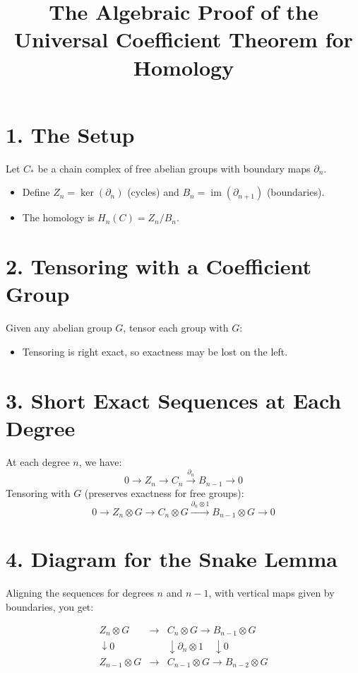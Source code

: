 \documentclass[12pt]{article}
\title{The Algebraic Proof of the Universal Coefficient Theorem for Homology}
\author{}
\date{}
\begin{document}
\maketitle

\section*{1. The Setup}

Let \( C_\ast \) be a chain complex of free abelian groups with boundary maps \( \partial_n \).
\begin{itemize}
    \item Define \( Z_n = \ker(\partial_n) \) (cycles) and \( B_n = \operatorname{im}(\partial_{n+1}) \) (boundaries).
    \item The homology is \( H_n(C) = Z_n / B_n \).
\end{itemize}

\section*{2. Tensoring with a Coefficient Group}

Given any abelian group \( G \), tensor each group with \( G \):
\begin{itemize}
    \item Tensoring is right exact, so exactness may be lost on the left.
\end{itemize}

\section*{3. Short Exact Sequences at Each Degree}

At each degree \( n \), we have:
\[
0 \longrightarrow Z_n \longrightarrow C_n \xrightarrow{\partial_n} B_{n-1} \longrightarrow 0
\]
Tensoring with \( G \) (preserves exactness for free groups):
\[
0 \longrightarrow Z_n \otimes G \longrightarrow C_n \otimes G \xrightarrow{\partial_n \otimes 1} B_{n-1} \otimes G \longrightarrow 0
\]

\section*{4. Diagram for the Snake Lemma}

Aligning the sequences for degrees \( n \) and \( n-1 \), with vertical maps given by boundaries, you get:

\[
\begin{array}{ccc}
Z_n \otimes G &\longrightarrow& C_n \otimes G \longrightarrow B_{n-1} \otimes G \\
\downarrow 0 && \downarrow \partial_n \otimes 1 \quad \downarrow 0 \\
Z_{n-1} \otimes G &\longrightarrow& C_{n-1} \otimes G \longrightarrow B_{n-2} \otimes G
\end{array}
\]
\end{document}
